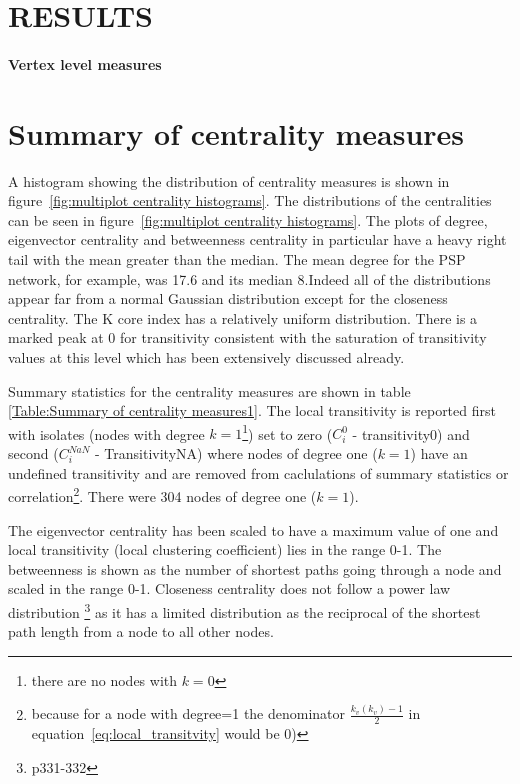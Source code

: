


\section{RESULTS}

\paragraph{Vertex level measures}
\section{Summary of centrality measures}
    A histogram showing the distribution of centrality measures is shown in figure~\ref{fig:multiplot centrality histograms}. The distributions of the centralities  can be seen in figure~\ref{fig:multiplot centrality histograms}. The plots of degree, eigenvector centrality and betweenness centrality in particular have a heavy right tail with the mean greater than the median. The mean degree for the PSP network, for example, was 17.6 and its median 8.Indeed all of the distributions appear far from a normal Gaussian distribution except for the  closeness centrality. The K core index has a relatively uniform distribution. There is a marked peak at 0 for transitivity consistent with the saturation of transitivity values at this level which has been extensively discussed already. 
    
Summary statistics for the centrality measures are shown in table \ref{Table:Summary of centrality measures1}. The local transitivity is reported first with isolates (nodes with degree $k=1$\footnote{there are no nodes with $k=0$}) set to zero ($C_i^0$ - transitivity0) and second  ($C_{i}^{NaN}$ - TransitivityNA) where nodes of degree one ($k=1$) have an undefined transitivity and are removed from caclulations of summary statistics or correlation\footnote{because for a node with degree=1 the denominator $\frac{k_v(k_v)-1}{2}$ in equation~\ref{eq:local_transitvity}  would be 0)}.  There were 304 nodes of degree one ($k=1$). 

The eigenvector centrality has been scaled to have a maximum value of one and local transitivity (local clustering coefficient) lies in the range 0-1. The betweenness is shown as the number of shortest paths going through a node and scaled in the range 0-1.
    Closeness centrality  does not follow a power law distribution \cite{newman2018networks}\footnote{p331-332} as it has a limited distribution as the reciprocal of the shortest path length from a node to all other nodes.   
    
